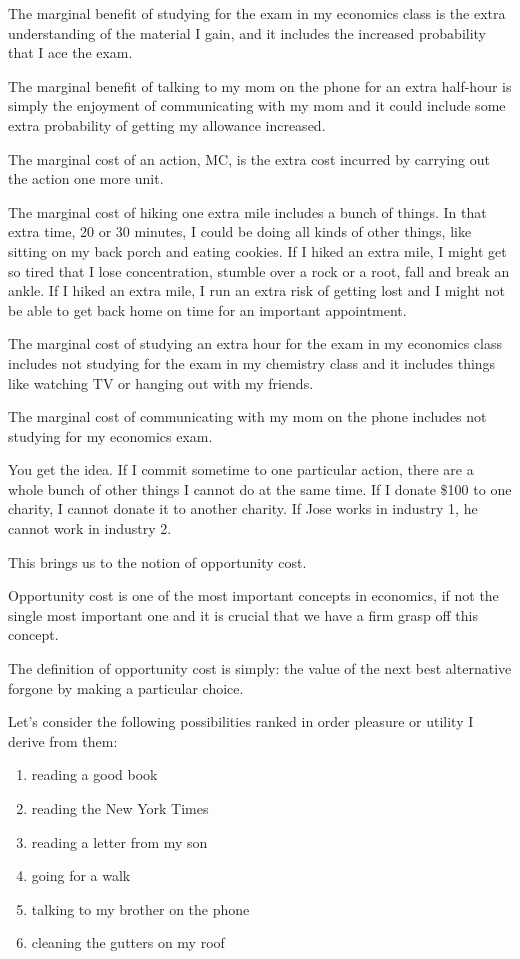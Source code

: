 \documentclass[
]{book}
\providecommand{\tightlist}{%
  \setlength{\itemsep}{0pt}\setlength{\parskip}{0pt}}
\begin{document}
The marginal benefit of studying for the exam in my economics class is the extra understanding of the material I gain, and it includes the increased probability that I ace the exam.

The marginal benefit of talking to my mom on the phone for an extra half-hour is simply the enjoyment of communicating with my mom and it could include some extra probability of getting my allowance increased.

The marginal cost of an action, MC, is the extra cost incurred by carrying out the action one more unit.

The marginal cost of hiking one extra mile includes a bunch of things. In that extra time, 20 or 30 minutes, I could be doing all kinds of other things, like sitting on my back porch and eating cookies. If I hiked an extra mile, I might get so tired that I lose concentration, stumble over a rock or a root, fall and break an ankle. If I hiked an extra mile, I run an extra risk of getting lost and I might not be able to get back home on time for an important appointment.

The marginal cost of studying an extra hour for the exam in my economics class includes not studying for the exam in my chemistry class and it includes things like watching TV or hanging out with my friends.

The marginal cost of communicating with my mom on the phone includes not studying for my economics exam.

You get the idea. If I commit sometime to one particular action, there are a whole bunch of other things I cannot do at the same time. If I donate \$100 to one charity, I cannot donate it to another charity. If Jose works in industry 1, he cannot work in industry 2.

This brings us to the notion of opportunity cost.

Opportunity cost is one of the most important concepts in economics, if not the single most important one and it is crucial that we have a firm grasp off this concept.

The definition of opportunity cost is simply: the value of the next best alternative forgone by making a particular choice.

Let's consider the following possibilities ranked in order pleasure or utility I derive from them:

\begin{enumerate}
\def\labelenumi{\arabic{enumi}.}
\tightlist
\item
  reading a good book
\item
  reading the New York Times
\item
  reading a letter from my son
\item
  going for a walk
\item
  talking to my brother on the phone
\item
  cleaning the gutters on my roof
\end{enumerate}
\end{document}
